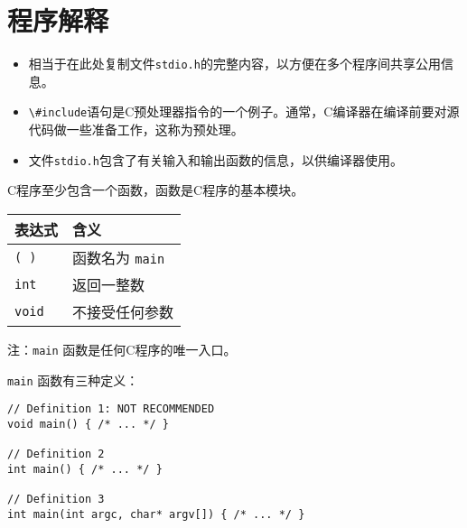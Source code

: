 \section{程序解释}
\begin{frame}



\begin{itemize}
\item
相当于在此处复制文件\lstinline|stdio.h|的完整内容，以方便在多个程序间共享公用信息。\\[0.1in]
\item
\lstinline|\#include|语句是C预处理器指令的一个例子。通常，C编译器在编译前要对源代码做一些准备工作，这称为预处理。
\\[0.1in]
\item
文件\lstinline|stdio.h|包含了有关输入和输出函数的信息，以供编译器使用。
\end{itemize}
\end{frame}

\begin{frame}

 
C程序至少包含一个函数，函数是C程序的基本模块。\\[0.1in]
\begin{table}
\centering
\begin{tabular}{ll}
表达式 & 含义 \\ \hline
\lstinline|( )| &  函数名为 \lstinline|main| \\[0.1in]
\lstinline|int| &  返回一整数\\[0.1in]
\lstinline|void| & 不接受任何参数 \\ \hline
\end{tabular}
\end{table}
 
注：\lstinline|main| 函数是任何C程序的唯一入口。
\end{frame}

\begin{frame}[fragile]
\lstinline|main| 函数有三种定义：
\begin{lstlisting}
// Definition 1: NOT RECOMMENDED
void main() { /* ... */ }

// Definition 2
int main() { /* ... */ }

// Definition 3
int main(int argc, char* argv[]) { /* ... */ }
\end{lstlisting}
\end{frame}

